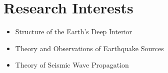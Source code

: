 \section{Research Interests}

\begin{itemize}
\item Structure of the Earth's Deep Interior
\item Theory and Observations of Earthquake Sources
\item Theory of Seismic Wave Propagation
\end{itemize}
